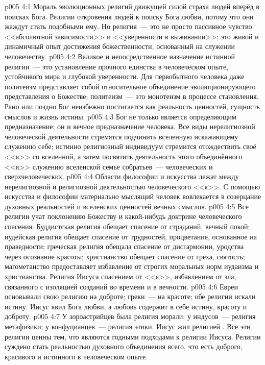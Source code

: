 \vs p005 4:1 Мораль эволюционных религий движущей силой страха  людей вперёд в поисках Бога. Религии откровения  людей к поиску Бога любви, потому что они жаждут стать подобными ему. Но религия~--- это не просто пассивное чувство <<абсолютной зависимости>> и <<уверенности в выживании>>; это живой и динамичный опыт достижения божественности, основанный на служении человечеству.
\vs p005 4:2 Великое и непосредственное назначение истинной религии~--- это установление прочного единства в человеческом опыте, устойчивого мира и глубокой уверенности. Для первобытного человека даже политеизм представляет собой относительное объединение эволюционирующего представления о Божестве; политеизм~--- это монотеизм в процессе становления. Рано или поздно Бог неизбежно постигается как реальность ценностей, сущность смыслов и жизнь истины.
\vs p005 4:3 Бог не только является определяющим предназначение; он и  вечное предназначение человека. Все виды нерелигиозной человеческой деятельности стремятся подчинить вселенную искажающему служению себе; истинно религиозный индивидуум стремится отождествить своё <<я>> со вселенной, а затем посвятить деятельность этого объединённого <<я>> служению вселенской семье собратьев~--- человеческих и сверхчеловеческих.
\vs p005 4:4 \pc Области философии и искусства лежат между нерелигиозной и религиозной деятельностью человеческого <<я>>. С помощью искусства и философии материально мыслящий человек вовлекается в созерцание духовных реальностей и вселенских ценностей вечных смыслов.
\vs p005 4:5 \pc Все религии учат поклонению Божеству и какой\hyp{}нибудь доктрине человеческого спасения. Буддистская религия обещает спасение от страданий, вечный покой; иудейская религия обещает спасение от трудностей, процветание, основанное на праведности; греческая религия обещала спасение от дисгармонии, уродства через осознание красоты; христианство обещает спасение от греха, святость; магометанство предоставляет избавление от строгих моральных норм иудаизма и христианства. Религия Иисуса  спасением от <<я>>, избавлением от зла, связанного с изоляцией созданий во времени и в вечности.
\vs p005 4:6 Евреи основывали свою религию на доброте; греки~--- на красоте; обе религии искали истину. Иисус явил Бога любви, а любовь содержит в себе истину, красоту и доброту.
\vs p005 4:7 У зороастрийцев была религия морали; у индусов~--- религия метафизики; у конфуцианцев~--- религия этики. Иисус жил религией . Все эти религии ценны тем, что являются годными подходами к религии Иисуса. Религии суждено стать реальностью духовного объединения всего, что есть доброго, красивого и истинного в человеческом опыте.
